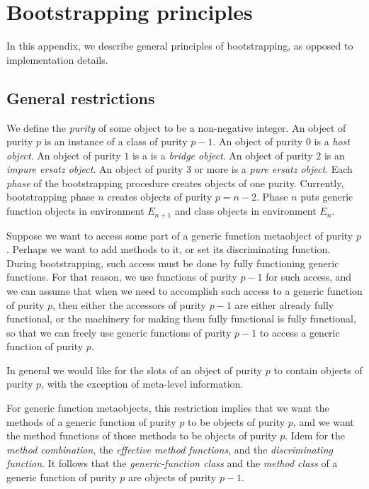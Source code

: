 \chapter{Bootstrapping principles}

In this appendix, we describe general principles of bootstrapping, as
opposed to implementation details.

\section{General restrictions}

We define the \emph{purity} of some object to be a non-negative
integer.  An object of purity $p$ is an instance of a class of purity
$p-1$.  An object of purity $0$ is a \emph{host object}.  An object of
purity $1$ is a is a \emph{bridge object}.  An object of purity $2$ is
an \emph{impure ersatz object}.  An object of purity $3$ or more is a
\emph{pure ersatz object}.  Each \emph{phase} of the bootstrapping
procedure creates objects of one purity.  Currently, bootstrapping
phase $n$ creates objects of purity $p=n-2$.  Phase $n$ puts generic
function objects in environment $E_{n+1}$ and class objects in
environment $E_n$.

Suppose we want to access some part of a generic function metaobject
of purity $p$.  Perhaps we want to add methods to it, or set its
discriminating function.  During bootstrapping, such access must be
done by fully functioning generic functions.  For that reason, we use
functions of purity $p-1$ for such access, and we can assume that when
we need to accomplish such access to a generic function of purity $p$,
then either the accessors of purity $p-1$ are either already fully
functional, or the machinery for making them fully functional is fully
functional, so that we can freely use generic functions of purity
$p-1$ to access a generic function of purity $p$.

In general we would like for the slots of an object of purity $p$ to
contain objects of purity $p$, with the exception of meta-level
information.

For generic function metaobjects, this restriction implies that we
want the methods of a generic function of purity $p$ to be objects of
purity $p$, and we want the method functions of those methods to be
objects of purity $p$.  Idem for the \emph{method combination}, the
\emph{effective method functions}, and the \emph{discriminating
  function}.  It follows that the \emph{generic-function class} and
the \emph{method class} of a generic function of purity $p$ are
objects of purity $p-1$.

